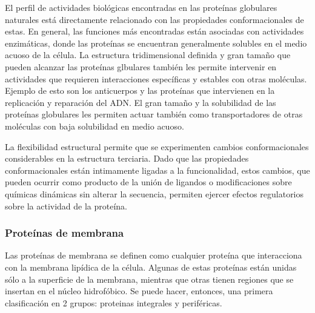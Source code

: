 El perfil de actividades biológicas encontradas en las proteínas globulares naturales está directamente relacionado con las propiedades conformacionales de estas.
En general, las funciones más encontradas están asociadas con actividades enzimáticas, donde las proteínas se encuentran generalmente solubles en el medio acuoso de la célula.
La estructura tridimensional definida y gran tamaño que pueden alcanzar las proteínas glbulares también les permite intervenir en actividades que requieren interacciones específicas y estables con otras moléculas. Ejemplo de esto son los anticuerpos y las proteínas que intervienen en la replicación y reparación del ADN.
El gran tamaño y la solubilidad de las proteínas globulares les permiten actuar también como transportadores de otras moléculas con baja solubilidad en medio acuoso.

La flexibilidad estructural permite que se experimenten cambios conformacionales considerables en la estructura terciaria. 
Dado que las propiedades conformacionales están intimamente ligadas a la funcionalidad, estos cambios, 
que pueden ocurrir como producto de la unión de ligandos o modificaciones sobre químicas dinámicas sin alterar la secuencia, permiten ejercer efectos regulatorios sobre la actividad de la proteína.






% 
% 
% 

















\subsubsection{Proteínas de membrana}
Las proteínas de membrana se definen como cualquier proteína que interacciona con la membrana lipídica de la célula.
Algunas de estas proteínas están unidas sólo a la superficie de la membrana, mientras que otras tienen regiones que se insertan en el núcleo hidrofóbico.
Se puede hacer, entonces, una primera clasificación en 2 grupos: proteinas integrales y periféricas.


